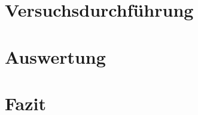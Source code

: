\documentclass[
    oneside, 
    footinclude=off, 
    captions=tableheading, 
    DIV=12;usenames,
    dvipsnames
]{scrartcl}
\begin{document}
\newpage
\section{Versuchsdurchführung}
    

\newpage
\section{Auswertung}
    

\newpage
\section{Fazit}
    


\newpage
    
\newpage
    \listoffigures
    \listoftables


%     
%     


%
\end{document}
